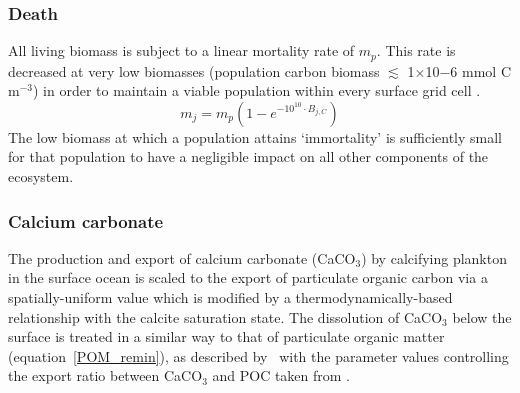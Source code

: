 \documentclass[gmd, manuscript]{copernicus}
\begin{document}



\subsubsection{Death}

All living biomass is subject to a linear mortality rate of $m_p$. This rate is decreased at very low biomasses (population carbon biomass $\lesssim$ 1$\times$10${-6}$ mmol C m$^{-3}$) in order to maintain a viable population within every surface grid cell \citep[``everything is everywhere, but the environment selects'',][]{BaasBecking:1934}. 
%
\begin{equation}
m_j = m_p (1-e^{-10^{10}\cdot B_{j,C}})
\end{equation}
%
The low biomass at which a population attains `immortality' is sufficiently small for that population to have a negligible impact on all other components of the ecosystem.










\subsubsection{Calcium carbonate}

The production and export of calcium carbonate (CaCO$_3$) by calcifying plankton in the surface ocean is scaled to the export of particulate organic carbon via a spatially-uniform value which is modified by a thermodynamically-based relationship with the calcite saturation state. The dissolution of CaCO$_3$ below the surface is treated in a similar way to that of particulate organic matter (equation~\ref{POM_remin}), as described by~\citet{Ridgwell:2007} with the parameter values controlling the export ratio between CaCO$_3$ and POC taken from \citet{Ridgwell:2007b}. 
\end{document}
